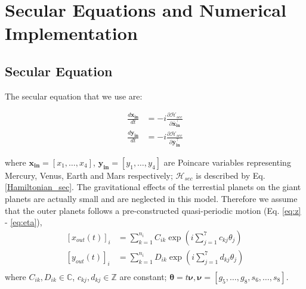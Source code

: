 \documentclass[12pt]{article}
\begin{document}
	\section{Secular Equations and Numerical Implementation} \label{sec:num}
	\subsection{Secular Equation}
	The secular equation that we use are:
	
	\begin{align}     \label{eq:main1}
	\frac{d \boldsymbol{x_{in}}}{dt} &= -i \frac{\partial \mathcal{H}_{sec}}{\partial \boldsymbol{\bar{x}_{in}^\top }} \\
	\frac{d \boldsymbol{y_{in}}}{dt} &= -i \frac{\partial \mathcal{H}_{sec}}{\partial \boldsymbol{\bar{y}_{in}^\top }}  \label{eq:main2}
	\end{align}
	
	where  $\boldsymbol{x_{in}} = [x_1,\dots,x_4]$,  $\boldsymbol{y_{in}} = [y_1,\dots,y_4]$ are Poincare variables representing Mercury, Venus, Earth and Mars respectively; $\mathcal{H}_{sec}$ is described by Eq. \ref{Hamiltonian_sec}. The gravitational effects of the terrestial planets on the giant planets are actually small and are neglected in this model. Therefore we assume that the outer planets follows a pre-constructed quasi-periodic motion (Eq. \ref{eq:z} - \ref{eq:eta}), 
	\begin{equation}
	\begin{aligned}
	\left[ x_{out}(t) \right]_i &=  \sum_{k=1}^{n_i} C_{ik} \exp \left(i \sum_{j=1}^7 c_{kj} \theta_j \right)\\
	\left[ y_{out}(t) \right]_i &=  \sum_{k=1}^{n_i} D_{ik} \exp \left(i \sum_{j=1}^7 d_{kj} \theta_j \right)\\
	\end{aligned}
	\end{equation}
	where $ C_{ik}, D_{ik} \in \mathbb{C} $, $c_{kj}, d_{kj} \in \mathbb{Z}$ are constant; $\boldsymbol{\theta}  = t \boldsymbol{\nu}, \boldsymbol{\nu} = [g_5,\dots, g_8,s_6,\dots,s_8].$
	
\end{document}

